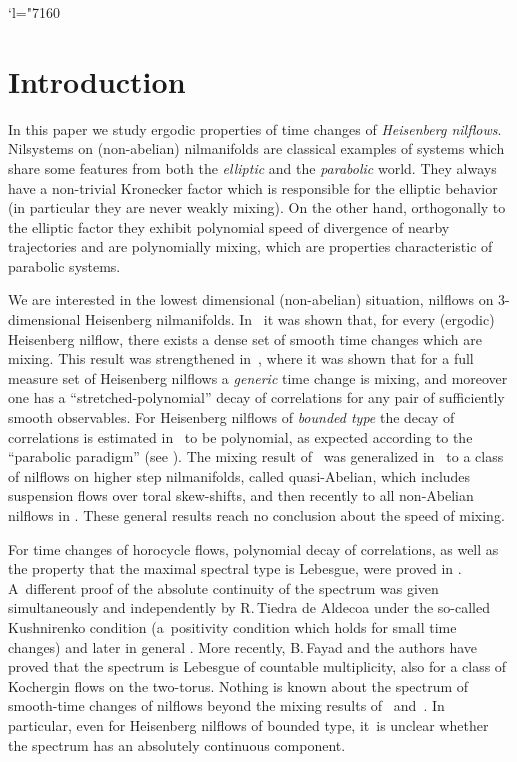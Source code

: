 \documentclass[JEP,XML,SOM,Unicode,NoEqCountersInSection]{cedram}
\newcommand{\Changel}{\mathcode`l="7160}
\theoremstyle{definition}
\theoremstyle{plain}
\begin{document}
\maketitle
\tableofcontents
\mainmatter

\Changel
\section{Introduction}
In this paper we study ergodic properties of time changes of \emph{Heisenberg nilflows}. Nilsystems on (non-abelian) nilmanifolds are classical examples of systems which share some features from both the \emph{elliptic} and the \emph{parabolic} world. They always have a non-trivial Kronecker factor which is responsible for the elliptic behavior (in particular they are never weakly mixing). On the other hand, orthogonally to the elliptic factor they exhibit
polynomial speed of divergence of nearby trajectories and are polynomially mixing, which are properties characteristic of parabolic systems.

We are interested in the lowest dimensional (non-abelian) situation, \ie nilflows on $3$-dimensional Heisenberg nilmanifolds. In~\cite{AFU} it was shown that, for every (\hbox{ergodic}) Heisenberg nilflow, there exists a dense set of smooth time changes which are mixing. This result was strengthened in~\cite{FK}, where it was shown that for a full measure set of Heisenberg nilflows a \emph{generic} time change is mixing, and moreover one has a ``stretched-polynomial'' decay of correlations for any pair of sufficiently smooth observables. For Heisenberg nilflows of \emph{bounded type} the decay of correlations is estimated in~\cite{FK} to be polynomial, as expected according to the
``parabolic paradigm'' (see \cite[\S8.2.f]{HK}). The mixing result of~\cite{AFU} was generalized in~\cite{Rav} to a class of nilflows on higher step nilmanifolds, called quasi-Abelian, which includes suspension flows over toral skew-shifts, and then recently to all non-Abelian nilflows in \cite{AFRU}. These general results reach no conclusion about the speed of mixing.

For time changes of horocycle flows, polynomial decay of correlations, as well as the property that the maximal spectral type is Lebesgue, were proved in \cite{FU}. A~different proof of the absolute continuity of the spectrum
was given simultaneously and independently by R.\,Tiedra de Aldecoa \cite{Tie1} under the so-called Kushnirenko condition (a~positivity condition which holds for small time changes) and later in general \cite{Tie2}.
More recently, B.\,Fayad and the authors \cite{FFK} have proved that the spectrum is Lebesgue of countable multiplicity, also for a class of Kochergin flows on the two-torus. Nothing is known about the spectrum of smooth-time changes of nilflows beyond the mixing results of~\cite{AFU} and~\cite{FK}. In particular, even for Heisenberg nilflows of bounded type, it~is unclear whether the spectrum has an absolutely continuous component.
\end{document}
